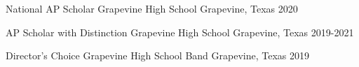 

\begin{cvhonors}

    \cvhonor
    {National AP Scholar}
    {Grapevine High School}
    {Grapevine, Texas}
    {2020}

    \cvhonor
    {AP Scholar with Distinction} %
    {Grapevine High School} %
    {Grapevine, Texas} %
    {2019-2021} %


\end{cvhonors}


\begin{cvhonors}

    \cvhonor
    {Director's Choice}
    {Grapevine High School Band}
    {Grapevine, Texas}
    {2019}

\end{cvhonors}
